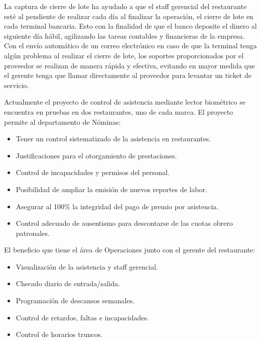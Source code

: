 La captura de cierre de lote ha ayudado a que el staff gerencial del restaurante esté al pendiente de realizar cada día al finalizar la operación, el cierre de lote en cada terminal bancaria. Esto con la finalidad de que el banco deposite el dinero al siguiente día hábil, agilizando las tareas contables y financieras de la empresa. Con el envío automático de un correo electrónico en caso de que la terminal tenga algún problema al realizar el cierre de lote, los soportes proporcionados por el proveedor se realizan de manera rápida y efectiva, evitando en mayor medida que el gerente tenga que llamar directamente al proveedor para levantar un ticket de servicio. 


Actualmente el proyecto de control de asistencia mediante lector biométrico se encuentra en pruebas en dos restaurantes, uno de cada marca. El proyecto permite al departamento de Nóminas:

\begin{itemize}
 \item Tener un control sistematizado de la asistencia en restaurantes.
 \item Justificaciones para el otorgamiento de prestaciones.
 \item Control de incapacidades y permisos del personal.
 \item Posibilidad de ampliar la emisión de nuevos reportes de labor.
 \item Asegurar al 100\% la integridad del pago de premio por asistencia.
 \item Control adecuado de ausentismo para descontarse de las cuotas obrero patronales.
\end{itemize}

El beneficio que tiene el área de Operaciones junto con el gerente del restaurante:

\begin{itemize}
 \item Visualización de la asistencia y staff gerencial.
 \item Checado diario de entrada/salida.
 \item Programación de descansos semanales.
 \item Control de retardos, faltas e incapacidades.
 \item Control de horarios truncos.
\end{itemize}

